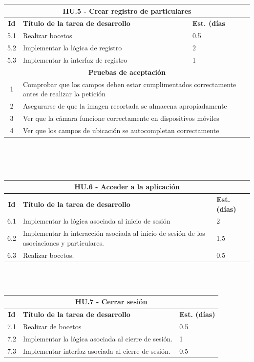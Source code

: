\begin{tabular}{|c|p{9.5cm}|p{1cm}|}
	\hline
	\multicolumn{3}{|c|}{\textbf{HU.5 - Crear registro de particulares}} \\
	\hline
	\textbf{Id} & \textbf{Título de la tarea de desarrollo} & \textbf{Est. (días} \\
	\hline
	5.1 & Realizar bocetos & 0.5 \\ \hline
	5.2 &  Implementar la lógica de registro & 2 \\ \hline
	5.3 &  Implementar la interfaz de registro & 1 \\ \hline
	\multicolumn{3}{|c|}{\textbf{Pruebas de aceptación}} \\ \hline
	1 & \multicolumn{2}{|p{10cm}|}{Comprobar que los campos deben estar cumplimentados correctamente antes de realizar la petición} \\ \hline
	2 & \multicolumn{2}{|p{10cm}|}{Asegurarse de que la imagen recortada se almacena apropiadamente} \\ \hline
	3 & \multicolumn{2}{|p{10cm}|}{Ver que la cámara funcione correctamente en dispositivos móviles} \\ \hline
	4 & \multicolumn{2}{|p{10cm}|}{Ver que los campos de ubicación se autocompletan correctamente} \\ \hline
\end{tabular} \\ \\\\

\begin{tabular}{|c|p{9.5cm}|p{1cm}|}
	\hline
	\multicolumn{3}{|c|}{\textbf{HU.6 - Acceder a la aplicación}} \\
	\hline
	\textbf{Id} & \textbf{Título de la tarea de desarrollo} & \textbf{Est. (días)} \\
	\hline
	6.1 &  Implementar la lógica asociada al inicio de sesión & 2 \\ \hline
	6.2 &  Implementar la interacción asociada al inicio de sesión de los asociaciones y particulares. & 1,5 \\ \hline
	6.3 &  Realizar bocetos. & 0.5 \\ \hline
\end{tabular} \\ \\




\begin{tabular}{|c|p{9.5cm}|p{1cm}|}
	\hline
	\multicolumn{3}{|c|}{\textbf{HU.7 - Cerrar sesión}} \\
	\hline
	\textbf{Id} & \textbf{Título de la tarea de desarrollo} & \textbf{Est. (días)} \\
	\hline
	7.1 & Realizar de bocetos & 0.5 \\ \hline
	7.2 &  Implementar la lógica asociada al cierre de sesión. & 1 \\ \hline
	7.3 &  Implementar interfaz asociada al cierre de sesión. & 0.5 \\ \hline
\end{tabular} \\ \\

